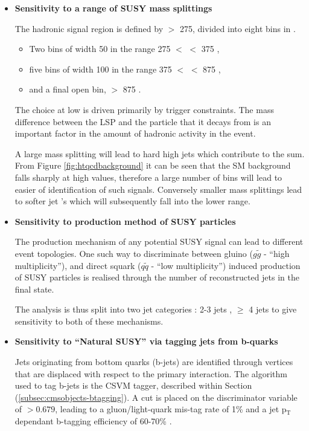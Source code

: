 \begin{itemize}

\item[] \textbf{Sensitivity to a range of \ac{SUSY} mass splittings}

The hadronic signal region is defined by \theht $>$ 275, divided into eight bins in \theht. 

\begin{itemize}
\item Two bins of width 50 \GeV in the range 275 $<$ \theht $<$ 375 \GeV,
\item five bins of width 100 \GeV in the range 375 $<$ \theht$<$ 875 \GeV,
\item and a final open bin, \theht $>$ 875 \GeV.
\end{itemize}

The choice at low \theht is driven primarily by trigger constraints. The mass difference between the \ac{LSP} and the particle that it decays from is an important factor in the amount of hadronic activity in the event. 

A large mass splitting will lead to hard high \pt jets which contribute to the \theht sum. From Figure \ref{fig:htqcdbackground} it can be seen that the \ac{SM} background falls sharply at high \theht values, therefore a large number of \theht bins will lead to easier of identification of such signals. Conversely smaller mass splittings lead to softer jet \pt's which will subsequently fall into the lower \theht range.

\item[] \textbf{Sensitivity to production method of \ac{SUSY} particles}

The production mechanism of any potential \ac{SUSY} signal can lead to different event topologies. One such way to discriminate between gluino ($g\widetilde{g}$ - ``high multiplicity''), and direct squark ($q\widetilde{q}$ - ``low multiplicity'') induced production of \ac{SUSY} particles is realised through the number of reconstructed jets in the final state.  

The analysis is thus split into two jet categories : 2-3 jets , $\geq$ 4 jets to give sensitivity to both of these mechanisms. 

\item[] \textbf{Sensitivity to  ``Natural \ac{SUSY}'' via tagging jets from b-quarks}

Jets originating from bottom quarks (b-jets) are identified through vertices that are displaced with respect to the primary interaction. The algorithm used to tag b-jets is the \acf{CSVM} tagger, described within Section (\ref{subsec:cmsobjects-btagging}). A cut is placed on the discriminator variable of $> 0.679$, leading to a gluon/light-quark mis-tag rate of 1\% and a jet p$_{\text{T}}$ dependant b-tagging efficiency of 60-70\% \cite{btag8tev}.


\end{itemize}
